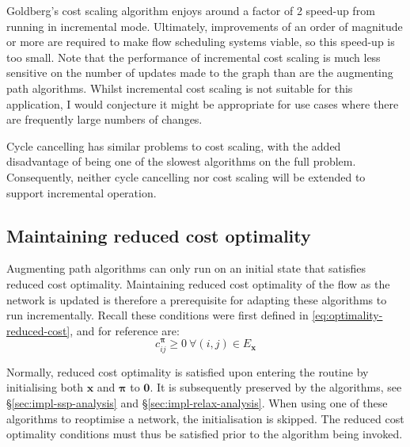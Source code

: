 Goldberg's cost scaling algorithm enjoys around a factor of 2 speed-up from running in incremental mode. Ultimately, improvements of an order of magnitude or more are required to make flow scheduling systems viable, so this speed-up is too small. Note that the performance of incremental cost scaling is much less sensitive on the number of updates made to the graph than are the augmenting path algorithms\footnotemark. Whilst incremental cost scaling is not suitable for this application, I would conjecture it might be appropriate for use cases where there are frequently large numbers of changes. %

Cycle cancelling has similar problems to cost scaling, with the added disadvantage of being one of the slowest algorithms on the full problem. Consequently, neither cycle cancelling nor cost scaling will be extended to support incremental operation.

\subsection{Maintaining reduced cost optimality}

Augmenting path algorithms can only run on an initial state that satisfies reduced cost optimality. Maintaining reduced cost optimality of the flow as the network is updated is therefore a prerequisite for adapting these algorithms to run incrementally. Recall these conditions were first defined in \cref{eq:optimality-reduced-cost}, and for reference are:
\[c_{ij}^{\boldsymbol{\pi}}\geq0\:\forall(i,j)\in E_{\mathbf{x}}\]

Normally, reduced cost optimality is satisfied upon entering the routine by initialising both $\mathbf{x}$ and $\boldsymbol{\pi}$ to $\mathbf{0}$. It is subsequently preserved by the algorithms, see \S\ref{sec:impl-ssp-analysis} and \S\ref{sec:impl-relax-analysis}. When using one of these algorithms to reoptimise a network, the initialisation is skipped\footnotemark. The reduced cost optimality conditions must thus be satisfied prior to the algorithm being invoked.

